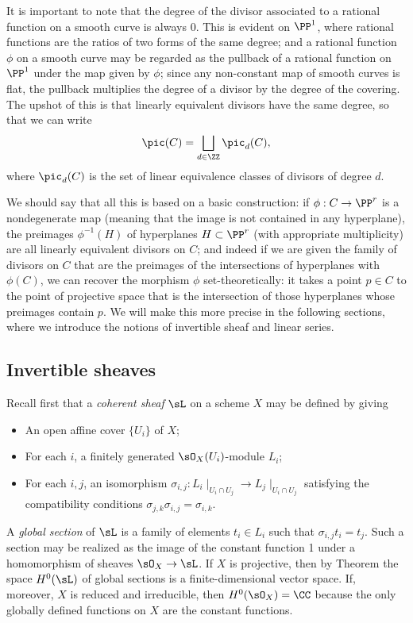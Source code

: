 It is important to note that the degree of the divisor associated to a rational function on a smooth curve is always 0. This is evident on $\PP^1$, where rational 
functions are the ratios of two forms of the same degree; and a rational function $\phi$ on a smooth curve may be regarded as the pullback of a rational function
on $\PP^1$ under the map given by $\phi$; since any non-constant map of smooth curves is flat, the pullback multiplies the degree of a divisor by the degree 
of the covering. The upshot of this is that linearly equivalent divisors have the same degree, so that we can write
$$
\pic(C) = \bigsqcup_{d \in \ZZ} \pic_d(C),
$$
where $\pic_d(C)$ is the set of linear equivalence classes of divisors of degree $d$.

We should say that all this is based on a basic construction: if $\phi : C \to \PP^r$ is a nondegenerate map (meaning that the image is not contained in any hyperplane), the preimages $\phi^{-1}(H)$ of hyperplanes $H \subset \PP^r$ (with appropriate multiplicity) are all linearly equivalent divisors on $C$; and indeed if we are given the family of divisors on $C$ that are the preimages of the intersections of hyperplanes with  $\phi(C)$, we can recover the morphism $\phi$ set-theoretically: it takes a point $p\in C$ to the point of projective space that is the intersection of those
hyperplanes whose preimages contain $p$. We will make this more precise in the following sections, where we introduce the notions of invertible sheaf and linear series.


\subsection{Invertible sheaves}\label{Invertible sheaves}

Recall first that a \emph{coherent sheaf} $\sL$ on a scheme $X$ may be defined by
giving 
\begin{itemize}
 \item An open affine cover $\{U_{i}\}$ of $X$; 
 \item For each $i$, a finitely generated $\sO_{X}(U_{i})$-module $L_{i}$;
 \item For each $i,j$, an isomorphism $\sigma_{i,j}: L_{i}\mid_{U_{i}\cap U_{j}} \to L_{j}\mid_{U_{i}\cap U_{j}}$
 satisfying the compatibility conditions $\sigma_{j,k}\sigma_{i,j} = \sigma_{i,k}$. 
 \end{itemize}

A \emph{global section} of $\sL$ is a family of elements $t_{i}\in L_{i}$ such that 
$\sigma_{i,j} t_{i} = t_{j}$. Such a section may be realized as the image of the constant function 1 under
a homomorphism of sheaves $\sO_{X} \to \sL$. If $X$ is projective, then 
by Theorem \cite[Thm III.5.2]{H} the space $H^{0}(\sL)$  of global sections is
a finite-dimensional vector space. If, moreover, $X$ is reduced and irreducible, then $H^{0}(\sO_{X}) = \CC$ because the only globally defined
functions on $X$ are the constant functions.

